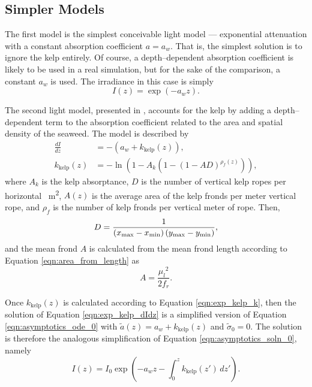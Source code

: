 \subsection{Simpler Models}
The first model is the simplest conceivable light model --- exponential attenuation with a constant absorption coefficient $a=a_w$.
That is, the simplest solution is to ignore the kelp entirely.
Of course, a depth--dependent absorption coefficient is likely to be used in a real simulation, but for the sake of the comparison, a constant $a_w$ is used.
The irradiance in this case is simply
\begin{equation}
  I(z) = \exp\left(-a_w z \right).
\end{equation}

The second light model, presented in \citep{broch_modelling_2012}, accounts for the kelp by adding a depth--dependent term to the absorption coefficient related to the area and spatial density of the seaweed.
The model is described by
\begin{align}
  \frac{dI}{dz} &= -\left(a_w + k_{\mbox{kelp}}(z)\right),
  \label{eqn:exp_kelp_dIdz}\\
  k_{\mbox{kelp}}(z) &= -\ln(1-A_k(1-(1-AD)^{\rho_f(z)})),
  \label{eqn:exp_kelp_k}
\end{align}
where $A_k$ is the kelp absorptance, $D$ is the number of vertical kelp ropes per horizontal \SI{}{\m\squared}, $A(z)$ is the average area of the kelp fronds per meter vertical rope, and $\rho_f$ is the number of kelp fronds per vertical meter of rope.
Then,
\begin{equation}
  D = \frac{1}{\left({x_{\max}}-{x_{\min}}\right) \left({y_{\max}}-{y_{\min}}\right)},
\end{equation}
and the mean frond $A$ is calculated from the mean frond length according to Equation \eqref{eqn:area_from_length} as
\begin{equation}
  A = \frac{{\mu_l}^2}{2f_r}.
\end{equation}

Once $k_{\mbox{kelp}}(z)$ is calculated according to Equation \eqref{eqn:exp_kelp_k}, then the solution of Equation \eqref{eqn:exp_kelp_dIdz} is a simplified version of Equation \eqref{eqn:asymptotics_ode_0} with $\tilde{a}(z)=a_w+k_{\mbox{kelp}}(z)$ and $\tilde{\sigma}_0=0$.
The solution is therefore the analogous simplification of Equation \eqref{eqn:asymptotics_soln_0}, namely
\begin{equation}
  I(z) = I_0 \exp\left(-a_wz - \int_0^z k_{\mbox{kelp}}(z')\, dz' \right).
\end{equation}

